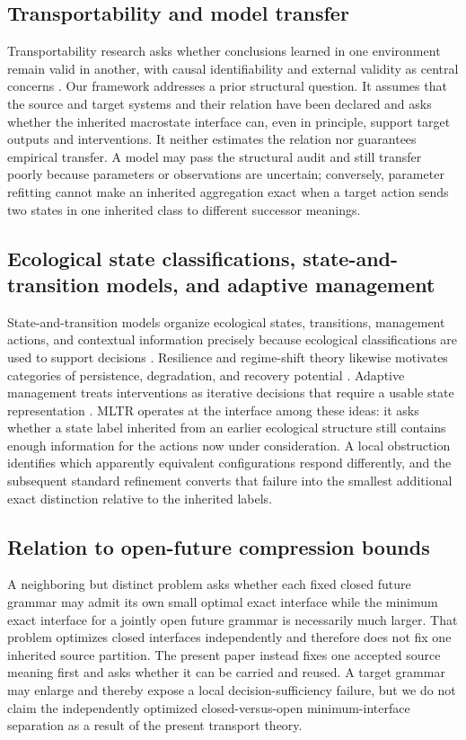 \documentclass[11pt]{article}
\begin{document}
\subsection{Transportability and model transfer}
Transportability research asks whether conclusions learned in one environment remain valid in another, with causal identifiability and external validity as central concerns \citep{PearlBareinboim2014}. Our framework addresses a prior structural question. It assumes that the source and target systems and their relation have been declared and asks whether the inherited macrostate interface can, even in principle, support target outputs and interventions. It neither estimates the relation nor guarantees empirical transfer. A model may pass the structural audit and still transfer poorly because parameters or observations are uncertain; conversely, parameter refitting cannot make an inherited aggregation exact when a target action sends two states in one inherited class to different successor meanings.

\subsection{Ecological state classifications, state-and-transition models, and adaptive management}
State-and-transition models organize ecological states, transitions, management actions, and contextual information precisely because ecological classifications are used to support decisions \citep{BestelmeyerEtAl2017}. Resilience and regime-shift theory likewise motivates categories of persistence, degradation, and recovery potential \citep{Holling1973,SchefferEtAl2001}. Adaptive management treats interventions as iterative decisions that require a usable state representation \citep{Holling1978,Walters1986}. MLTR operates at the interface among these ideas: it asks whether a state label inherited from an earlier ecological structure still contains enough information for the actions now under consideration. A local obstruction identifies which apparently equivalent configurations respond differently, and the subsequent standard refinement converts that failure into the smallest additional exact distinction relative to the inherited labels.

\subsection{Relation to open-future compression bounds}
A neighboring but distinct problem asks whether each fixed closed future grammar may admit its own small optimal exact interface while the minimum exact interface for a jointly open future grammar is necessarily much larger. That problem optimizes closed interfaces independently and therefore does not fix one inherited source partition. The present paper instead fixes one accepted source meaning first and asks whether it can be carried and reused. A target grammar may enlarge and thereby expose a local decision-sufficiency failure, but we do not claim the independently optimized closed-versus-open minimum-interface separation as a result of the present transport theory.
\end{document}
